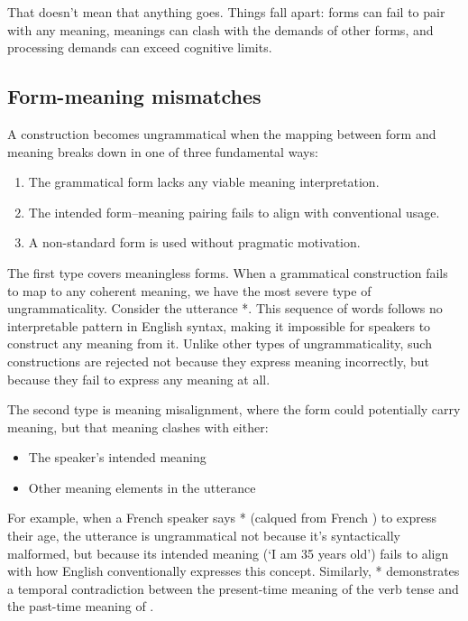 That doesn't mean that anything goes. Things fall apart: forms can fail to pair with any meaning, meanings can clash with the demands of other forms, and processing demands can exceed cognitive limits.

\subsection{Form-meaning mismatches}
A construction becomes ungrammatical when the mapping between form and meaning breaks down in one of three fundamental ways:
\begin{enumerate}[noitemsep]
    \item The grammatical form lacks any viable meaning interpretation.
    \item The intended form--meaning pairing fails to align with conventional usage.
    \item A non-standard form is used without pragmatic motivation.
\end{enumerate}

The first type covers meaningless forms. When a grammatical construction fails to map to any coherent meaning, we have the most severe type of ungrammaticality. Consider the utterance *. This sequence of words follows no interpretable pattern in English syntax, making it impossible for speakers to construct any meaning from it. Unlike other types of ungrammaticality, such constructions are rejected not because they express meaning incorrectly, but because they fail to express any meaning at all.

The second type is meaning misalignment, where the form could potentially carry meaning, but that meaning clashes with either:
\begin{itemize}[noitemsep]
    \item The speaker's intended meaning
    \item Other meaning elements in the utterance
\end{itemize}

For example, when a French speaker says * (calqued from French ) to express their age, the utterance is ungrammatical not because it's syntactically malformed, but because its intended meaning (`I am 35 years old') fails to align with how English conventionally expresses this concept. Similarly, * demonstrates a temporal contradiction between the present-time meaning of the verb tense and the past-time meaning of .


